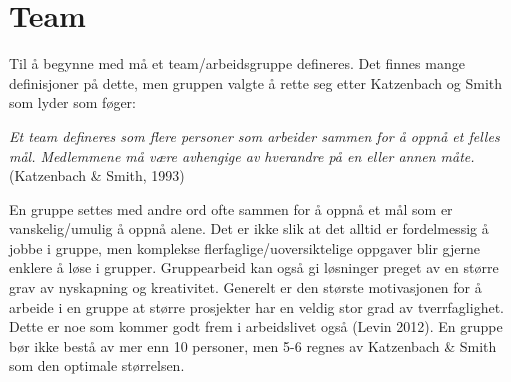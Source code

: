 \section{Team}
Til å begynne med må et team/arbeidsgruppe defineres. 
Det finnes mange definisjoner på dette, men gruppen valgte å rette seg etter Katzenbach og Smith som lyder som føger: 

\begin{center}
\textit{Et team defineres som flere personer som arbeider sammen for å oppnå et felles mål. \newline
Medlemmene må være avhengige av hverandre på en eller annen måte.}
\newline 
(Katzenbach \& Smith, 1993)
\end{center}

En gruppe settes med andre ord ofte sammen for å oppnå et mål som er vanskelig/umulig å oppnå alene. 
Det er ikke slik at det alltid er fordelmessig å jobbe i gruppe, men komplekse flerfaglige/uoversiktelige oppgaver blir gjerne enklere å løse i grupper.
Gruppearbeid kan også gi løsninger preget av en større grav av nyskapning og kreativitet. 
Generelt er den største motivasjonen for å arbeide i en gruppe at større prosjekter har en veldig stor grad av tverrfaglighet. 
Dette er noe som kommer godt frem i arbeidslivet også (Levin 2012). 
En gruppe bør ikke bestå av mer enn 10 personer, men 5-6 regnes av Katzenbach \& Smith som den optimale størrelsen.

